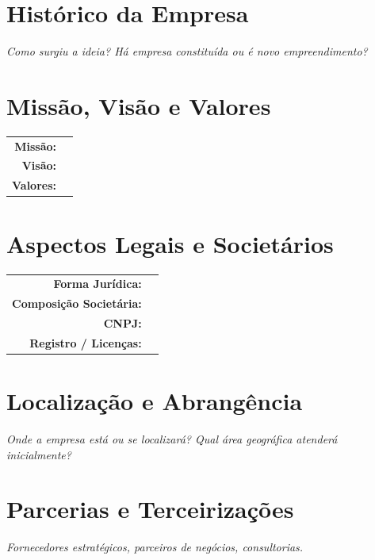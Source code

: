 \documentclass[
	12pt,
	openright,
	oneside,
	a4paper,
	chapter=TITLE,
	section=TITLE,
	english,
	brazil
	]{abntex2}
\newcommand{\tcampo}[1]{%
	{#1}%
}
\newcommand{\instrucao}[1]{%
	\vspace{0.3cm}%
	\noindent%
	{%
		\setlength{\fboxsep}{6pt}%
		\colorbox{azul-claro}{%
			\begin{minipage}{\dimexpr\textwidth-2\fboxsep\relax}%
				\setlength{\parindent}{1.25cm}%
				{\color{cinza-instrucao}\small\itshape #1}%
			\end{minipage}%
		}%
	}%
	\vspace{0.3cm}%
}
\begin{document}
\section{Histórico da Empresa}

\instrucao{Como surgiu a ideia? Há empresa constituída ou é novo empreendimento?}

\section{Missão, Visão e Valores}

\centering
\begin{tabularx}{\textwidth}{r X}
\textbf{Missão:}   & \tcampo{} \\[0.3cm]
\textbf{Visão:}    & \tcampo{} \\[0.3cm]
\textbf{Valores:}  & \tcampo{} \\
\end{tabularx}

\section{Aspectos Legais e Societários}

\centering
\begin{tabularx}{\textwidth}{r X}
\textbf{Forma Jurídica:}       & \tcampo{} \\[0.3cm]
\textbf{Composição Societária:} & \tcampo{} \\[0.3cm]
\textbf{CNPJ:}                 & \tcampo{} \\[0.3cm]
\textbf{Registro / Licenças:}  & \tcampo{} \\
\end{tabularx}

\section{Localização e Abrangência}

\instrucao{Onde a empresa está ou se localizará? Qual área geográfica atenderá inicialmente?}

\section{Parcerias e Terceirizações}

\instrucao{Fornecedores estratégicos, parceiros de negócios, consultorias.}

\clearpage

\end{document}
